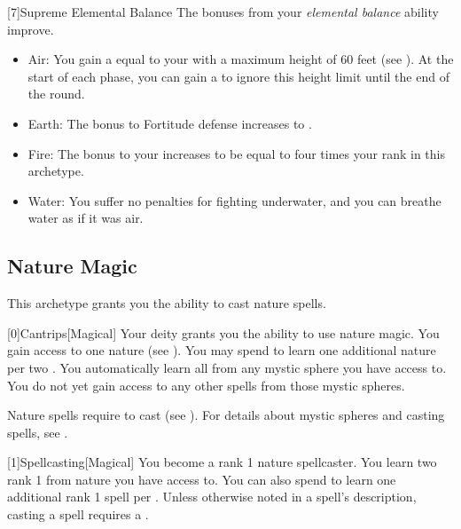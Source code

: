         [7]{Supreme Elemental Balance} The bonuses from your \textit{elemental balance} ability improve.
        \begin{itemize}
            \item Air: You gain a  equal to your  with a maximum height of 60 feet (see ).
            At the start of each phase, you can gain a  to ignore this height limit until the end of the round.
            \item Earth: The bonus to Fortitude defense increases to .
            \item Fire: The bonus to your  increases to be equal to four times your rank in this archetype.
            \item Water: You suffer no penalties for fighting underwater, and you can breathe water as if it was air.
        \end{itemize}

    \newpage
    \subsection{Nature Magic}
        This archetype grants you the ability to cast nature spells.

        [0]{Cantrips}[Magical]
        Your deity grants you the ability to use nature magic.
        You gain access to one nature  (see ).
        You may spend  to learn one additional nature  per two .
        You automatically learn all  from any mystic sphere you have access to.
        You do not yet gain access to any other spells from those mystic spheres.

        Nature spells require  to cast (see ).
        For details about mystic spheres and casting spells, see .

        [1]{Spellcasting}[Magical]
        You become a rank 1 nature spellcaster.
        You learn two rank 1  from nature  you have access to.
        You can also spend  to learn one additional rank 1 spell per .
        Unless otherwise noted in a spell's description, casting a spell requires a .

